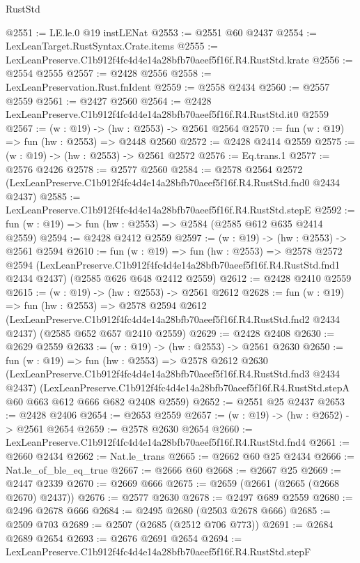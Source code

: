 \begin{lexlean}{RustStd}
\begin{coremodule}
@2551 := LE.le.{0} @19 instLENat
@2553 := @2551 @60 @2437
@2554 := LexLeanTarget.RustSyntax.Crate.items
@2555 := LexLeanPreserve.C1b912f4fc4d4e14a28bfb70aeef5f16f.R4.RustStd.krate
@2556 := @2554 @2555
@2557 := @2428 @2556
@2558 := LexLeanPreservation.Rust.fnIdent
@2559 := @2558 @2434
@2560 := @2557 @2559
@2561 := @2427 @2560
@2564 := @2428 LexLeanPreserve.C1b912f4fc4d4e14a28bfb70aeef5f16f.R4.RustStd.it0 @2559
@2567 := (w : @19) -> (hw : @2553) -> @2561 @2564
@2570 := fun (w : @19) => fun (hw : @2553) => @2448 @2560
@2572 := @2428 @2414 @2559
@2575 := (w : @19) -> (hw : @2553) -> @2561 @2572
@2576 := Eq.trans.{1}
@2577 := @2576 @2426
@2578 := @2577 @2560
@2584 := @2578
    @2564
    @2572
    (LexLeanPreserve.C1b912f4fc4d4e14a28bfb70aeef5f16f.R4.RustStd.fnd0 @2434 @2437)
@2585 := LexLeanPreserve.C1b912f4fc4d4e14a28bfb70aeef5f16f.R4.RustStd.stepE
@2592 := fun (w : @19) => fun (hw : @2553) => @2584 (@2585 @612 @635 @2414 @2559)
@2594 := @2428 @2412 @2559
@2597 := (w : @19) -> (hw : @2553) -> @2561 @2594
@2610 := fun (w : @19) =>
  fun (hw : @2553) =>
  @2578
    @2572
    @2594
    (LexLeanPreserve.C1b912f4fc4d4e14a28bfb70aeef5f16f.R4.RustStd.fnd1 @2434 @2437)
    (@2585 @626 @648 @2412 @2559)
@2612 := @2428 @2410 @2559
@2615 := (w : @19) -> (hw : @2553) -> @2561 @2612
@2628 := fun (w : @19) =>
  fun (hw : @2553) =>
  @2578
    @2594
    @2612
    (LexLeanPreserve.C1b912f4fc4d4e14a28bfb70aeef5f16f.R4.RustStd.fnd2 @2434 @2437)
    (@2585 @652 @657 @2410 @2559)
@2629 := @2428 @2408
@2630 := @2629 @2559
@2633 := (w : @19) -> (hw : @2553) -> @2561 @2630
@2650 := fun (w : @19) =>
  fun (hw : @2553) =>
  @2578
    @2612
    @2630
    (LexLeanPreserve.C1b912f4fc4d4e14a28bfb70aeef5f16f.R4.RustStd.fnd3 @2434 @2437)
    (LexLeanPreserve.C1b912f4fc4d4e14a28bfb70aeef5f16f.R4.RustStd.stepA
      @60
      @663
      @612
      @666
      @682
      @2408
      @2559)
@2652 := @2551 @25 @2437
@2653 := @2428 @2406
@2654 := @2653 @2559
@2657 := (w : @19) -> (hw : @2652) -> @2561 @2654
@2659 := @2578 @2630 @2654
@2660 := LexLeanPreserve.C1b912f4fc4d4e14a28bfb70aeef5f16f.R4.RustStd.fnd4
@2661 := @2660 @2434
@2662 := Nat.le_trans
@2665 := @2662 @60 @25 @2434
@2666 := Nat.le_of_ble_eq_true
@2667 := @2666 @60
@2668 := @2667 @25
@2669 := @2447 @2339
@2670 := @2669 @666
@2675 := @2659 (@2661 (@2665 (@2668 @2670) @2437))
@2676 := @2577 @2630
@2678 := @2497 @689 @2559
@2680 := @2496 @2678 @666
@2684 := @2495 @2680 (@2503 @2678 @666)
@2685 := @2509 @703
@2689 := @2507 (@2685 (@2512 @706 @773))
@2691 := @2684 @2689 @2654
@2693 := @2676 @2691 @2654
@2694 := LexLeanPreserve.C1b912f4fc4d4e14a28bfb70aeef5f16f.R4.RustStd.stepF

\end{coremodule}
\end{lexlean}
